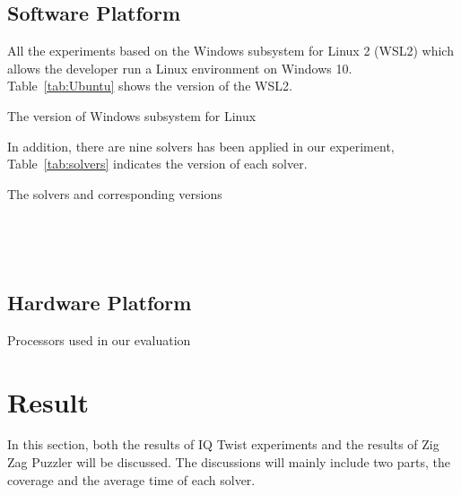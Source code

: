 \subsection{Software Platform}
\label{sec:softplat}
All the experiments based on the Windows subsystem for Linux 2 (WSL2) which allows the developer run a Linux environment on Windows 10. Table~\ref{tab:Ubuntu} shows the version of the WSL2.
\begin{table}[htbp]
  \centering

  \caption{The version of Windows subsystem for Linux}
  
  \label{tab:Ubuntu}
  
\end{table}
In addition, there are nine solvers has been applied in our experiment, Table~\ref{tab:solvers} indicates the version of each solver.
\begin{table}[htbp]
  \centering

  \caption{The solvers and corresponding versions}
  
  \label{tab:solvers}
  	\begin{subtable}[b]{\textwidth}
  	\centering
  
    \end{subtable}\\
    	\begin{subtable}[b]{\textwidth}
  	\centering
  
  \end{subtable}\\
  \begin{subtable}[b]{\textwidth}
  \centering
  
  \end{subtable}
\end{table}
\subsection{Hardware Platform}
\label{sec:hardplat}

\begin{table}[htbp]
  \centering

  \caption{Processors used in our evaluation}
  
  \label{tab:machines}
  
\end{table}


\section{Result}
\label{sec:Result}
In this section, both the results of IQ Twist experiments and the results of Zig Zag Puzzler will be discussed. The discussions will mainly include two parts, the coverage and the average time of each solver.
